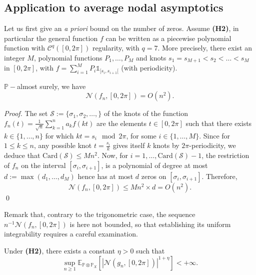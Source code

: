 \documentclass{svproc}
\newcommand{\Prob}{\mathbb{P}}
\newcommand \Esp {\mathbb{E}}
\begin{document}
\subsection{Application to average nodal asymptotics} \label{sec.ui}
Let us first give an \emph{a priori} bound on the number of zeros. Assume \textbf{(H2)}, in particular the general function $f$ can be written as a piecewise polynomial function with $ \mathcal{C}^{q}([0,2\pi])$ regularity, with $q=7$. More precisely, there exist an integer $M$, polynomial functions $P_1,\dots, P_M$ and knots $s_1=s_{M+1}<s_2<\dots<s_M$ in $[0,2\pi]$, with $f=\sum_{i=1}^M P_i \mathds{1}_{[s_i, s_{i+1}[}$ (with periodicity).
\begin{lemma}\label{lm.apriori} $\Prob-$almost surely, we have
$$\mathcal{N}(f_n,[0,2\pi]) = O(n^2).$$
\end{lemma}
\begin{proof}
The set $\mathcal{S}:=\{\sigma_1,\sigma_2, \dots,\}$ of the  knots of the function $f_n(t)=\frac{1}{\sqrt{n}} \sum_{k=1}^{n}a_kf(kt)$ are the elements $t \in [0,2\pi]$ such that there exists $k \in \{1,\dots, n\}$ for which $kt=s_i\mod 2 \pi$, for some $i \in \{1,\dots, M\}$. Since for $1\leq k \leq n$, any possible knot $t=\frac{s_i}{k}$ gives itself $k$ knots by $2\pi$-periodicity, we deduce that $\text{Card}(\mathcal{S}) \leq Mn^2$. Now, for $i=1,\dots, \text{Card}(\mathcal{S})-1$, the restriction of $f_n$ on the interval $[\sigma_i, \sigma_{i+1}]$, is a polynomial of degree at most $d:=\max(d_1,\dots,d_M)$ hence has at most $d$ zeros on $[\sigma_i,\sigma_{i+1}]$. Therefore, 
$$\mathcal{N}(f_n,[0,2\pi]) \leq Mn^2\times d=O(n^2).$$
\qed
\end{proof}
Remark that, contrary to the trigonometric case, the sequence $n^{-1}\mathcal{N}(f_n,[0,2\pi])$ is here not bounded, so that establishing its uniform integrability requires a careful examination.


\begin{proposition}\label{prop.eq.int}
Under \textbf{(H2)}, there exists a constant $\eta>0$ such that
$$\sup_{n\ge 1}\Esp_{\Prob \otimes \Prob_X}\left[\left|\mathcal{N}(g_n,[0,2\pi])\right|^{1+\eta}\right]<+\infty.$$
\end{proposition}
\end{document}
